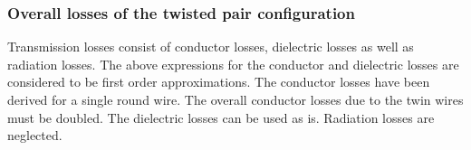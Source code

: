 \subsubsection{Overall losses of the twisted pair configuration}

Transmission losses consist of conductor losses, dielectric losses as
well as radiation losses.  The above expressions for the conductor and
dielectric losses are considered to be first order approximations.
The conductor losses have been derived for a single round wire.  The
overall conductor losses due to the twin wires must be doubled.  The
dielectric losses can be used as is.  Radiation losses are neglected.
